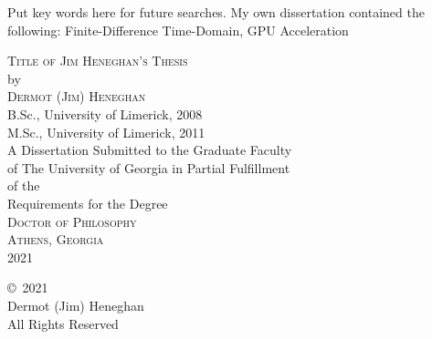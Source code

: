 \documentclass[12pt]{report}
\newcommand{\thesisyear}{2021} %
\newcommand{\yourname}{Dermot (Jim) Heneghan} %
\newcommand{\thesistitle}{Title of Jim Heneghan's Thesis} %
\begin{document}


\begin{list}{\sc Index words:\hfill}{\leftmargin 1.4in}
\item
\begin{flushleft}\singlespacing
Put key words here for future searches. My own dissertation contained the following:
Finite-Difference Time-Domain, 
GPU Acceleration
\end{flushleft}
\end{list}


\newpage
\setcounter{page}{1}
\thispagestyle{empty}
\vspace*{18pt}
\begin{center}
\textsc{\thesistitle}\\[18pt]
by\\[18pt]
\textsc{\yourname}\\[12pt]

B.Sc., University of Limerick, 2008\\
M.Sc., University of Limerick, 2011\\
\vfill
A Dissertation Submitted to the Graduate Faculty \\
of The University of Georgia in Partial Fulfillment \\
of the \\
Requirements for the Degree \\[10pt]
\textsc{Doctor of Philosophy}\\[36pt]
\textsc{Athens, Georgia}\\[18pt]
\thesisyear
\end{center}

\newpage
\thispagestyle{empty}
\vspace*{5.5in}
\begin{center}
\copyright~\thesisyear\ \\
\yourname\\
All Rights Reserved
\end{center}
\end{document}
